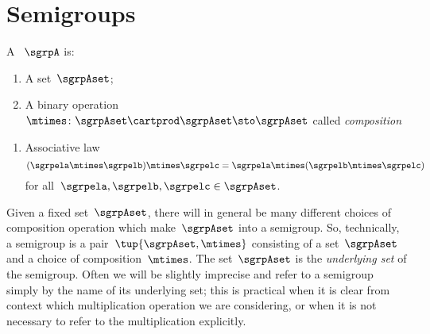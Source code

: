 

\section{Semigroups}
\label{sec:semigroups}

\begin{ctdefinition}[Semigroup]
    \label{def:semigroup}
    A \emph{}~$\sgrpA$ is:
    \begin{body}
        \constit
        \begin{enumerate}
            \item A set~$\sgrpAset$;
            \item A binary operation~$\mtimes  \colon \sgrpAset \cartprod \sgrpAset \sto \sgrpAset$ called \emph{composition}
        \end{enumerate}
        \condit
        \begin{enumerate}
            \item Associative law
            \begin{equation}
                \label{eq:semigroup-associative}
                (\sgrpela \mtimes   \sgrpelb)\mtimes   \sgrpelc
                = \sgrpela \mtimes   (\sgrpelb \mtimes  \sgrpelc)
            \end{equation}
            for all~$\sgrpela , \sgrpelb, \sgrpelc \in \sgrpAset$.
        \end{enumerate}
    \end{body}
\end{ctdefinition}



\begin{remark}
    Given a fixed set~$\sgrpAset$, there will in general be many different choices of composition operation which make~$\sgrpAset$ into a semigroup.
    So, technically, a semigroup is a pair~$\tup{\sgrpAset, \mtimes}$ consisting of a set~$\sgrpAset$ and a choice of composition~$\mtimes$.
    The set~$\sgrpAset$ is the \emph{underlying set} of the semigroup.
    Often we will be slightly imprecise and refer to a semigroup simply by the name of its underlying set;
    this is practical when it is clear from context which multiplication operation we are considering, or when it is not necessary to refer to the multiplication explicitly.
\end{remark}



